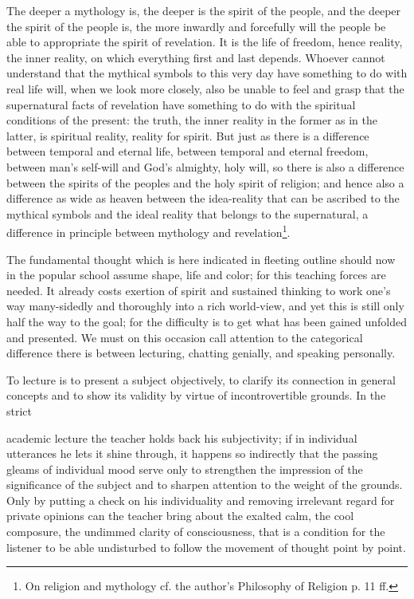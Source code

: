 \documentclass[12pt,a4paper,openany]{book}
\newcommand{\opage}[1]{\marginnote{\footnotesize\textit{[#1]}}}
\begin{document}
The deeper a mythology is, the deeper is the spirit of the people,
and the deeper the spirit of the people is, the more inwardly
and forcefully will the people be able to appropriate the spirit
of revelation. It is the life of freedom, hence reality,
the inner reality, on which everything first and last
\setcounter{footnote}{0}%
\opage{437}depends. Whoever cannot understand that the mythical
symbols to this very day have something to do with real
life will, when we look more closely, also
be unable to feel and grasp that the supernatural
facts of revelation have something to do with the spiritual
conditions of the present: the truth, the inner reality
in the former as in the latter, is spiritual reality, reality
for spirit. But just as there is a difference between temporal
and eternal life, between temporal and eternal freedom, between man's
self-will and God's almighty, holy will, so
there is also a difference between the spirits of the peoples and the holy spirit of
religion; and hence also a difference as wide as heaven
between the idea-reality that can be ascribed to
the mythical symbols and the ideal reality that
belongs to the supernatural, a difference in principle between
mythology and revelation\footnote[1]{On religion and mythology cf. the author's Philosophy of Religion p. 11 ff.}.

The fundamental thought which is here indicated in fleeting outline
should now in the popular school assume shape, life and
color; for this teaching forces are needed. It already costs
exertion of spirit and sustained thinking to work
one's way many-sidedly and thoroughly into a rich world-view, and
yet this is still only half the way to the goal; for the
difficulty is to get what has been gained unfolded and
presented. We must on this occasion call attention
to the categorical difference there is between
lecturing, chatting genially, and speaking personally.

To lecture is to present a subject objectively, to clarify
its connection in general concepts and to show its validity
by virtue of incontrovertible grounds. In the strict

\setcounter{footnote}{0}%
\opage{438}academic lecture the teacher holds back his subjectivity;
if in individual utterances he lets it shine through,
it happens so indirectly that the passing gleams of
individual mood serve only to strengthen the impression
of the significance of the subject and to sharpen attention to
the weight of the grounds. Only by putting a check on his
individuality and removing irrelevant regard for private
opinions can the teacher bring about the exalted
calm, the cool composure, the undimmed clarity
of consciousness, that is a condition for the listener
to be able undisturbed to follow the movement of thought point by
point.
\end{document}
